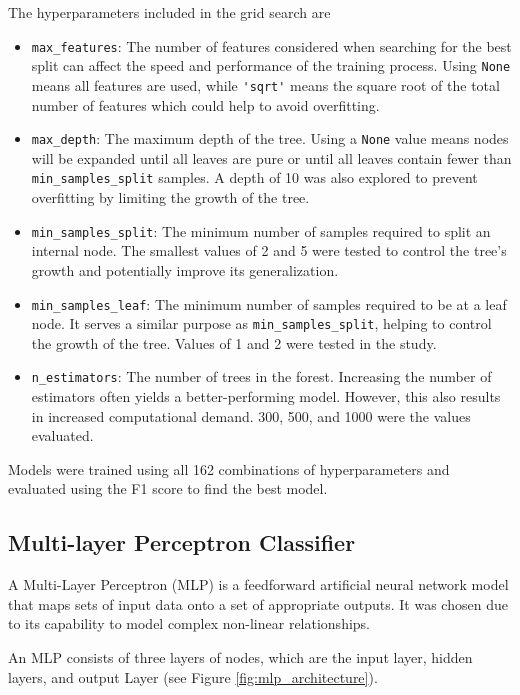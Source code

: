 \documentclass[a4paper,11pt]{report}
\begin{document}
The hyperparameters included in the grid search are 
\begin{itemize}
    \item \verb|max_features|: The number of features considered when searching for the best split can affect the speed and performance of the training process. Using \verb|None| means all features are used, while \verb|'sqrt'| means the square root of the total number of features which could help to avoid overfitting.
    \item \verb|max_depth|: The maximum depth of the tree. Using a \verb|None| value means nodes will be expanded until all leaves are pure or until all leaves contain fewer than \verb|min_samples_split| samples. A depth of 10 was also explored to prevent overfitting by limiting the growth of the tree.
    \item \verb|min_samples_split|: The minimum number of samples required to split an internal node. The smallest values of 2 and 5 were tested to control the tree's growth and potentially improve its generalization.
    \item \verb|min_samples_leaf|: The minimum number of samples required to be at a leaf node.  It serves a similar purpose as \verb|min_samples_split|, helping to control the growth of the tree. Values of 1 and 2 were tested in the study.
    \item \verb|n_estimators|: The number of trees in the forest.  Increasing the number of estimators often yields a better-performing model. However, this also results in increased computational demand. 300, 500, and 1000 were the values evaluated. 
\end{itemize}

Models were trained using all 162 combinations of hyperparameters and evaluated using the F1 score to find the best model.

\subsection{Multi-layer Perceptron Classifier}
A Multi-Layer Perceptron (MLP) is a feedforward artificial neural network model that maps sets of input data onto a set of appropriate outputs. It was chosen due to its capability to model complex non-linear relationships.

An MLP consists of three layers of nodes, which are the input layer, hidden layers, and output Layer (see Figure \ref{fig:mlp_architecture}). 
\end{document}
